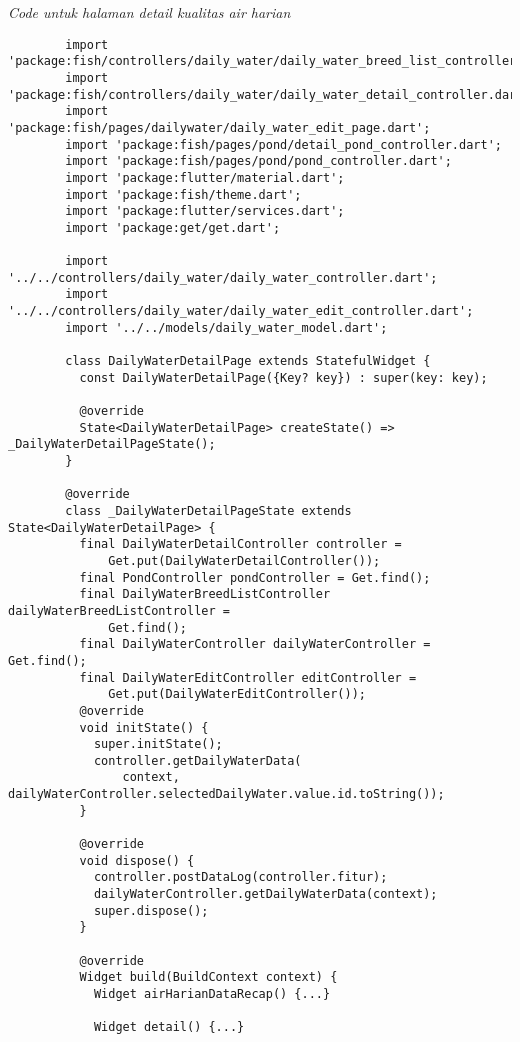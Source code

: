 	\textit{Code untuk halaman detail kualitas air harian}
	\begin{lstlisting}
        import 'package:fish/controllers/daily_water/daily_water_breed_list_controller.dart';
        import 'package:fish/controllers/daily_water/daily_water_detail_controller.dart';
        import 'package:fish/pages/dailywater/daily_water_edit_page.dart';
        import 'package:fish/pages/pond/detail_pond_controller.dart';
        import 'package:fish/pages/pond/pond_controller.dart';
        import 'package:flutter/material.dart';
        import 'package:fish/theme.dart';
        import 'package:flutter/services.dart';
        import 'package:get/get.dart';
        
        import '../../controllers/daily_water/daily_water_controller.dart';
        import '../../controllers/daily_water/daily_water_edit_controller.dart';
        import '../../models/daily_water_model.dart';
        
        class DailyWaterDetailPage extends StatefulWidget {
          const DailyWaterDetailPage({Key? key}) : super(key: key);
        
          @override
          State<DailyWaterDetailPage> createState() => _DailyWaterDetailPageState();
        }
        
        @override
        class _DailyWaterDetailPageState extends State<DailyWaterDetailPage> {
          final DailyWaterDetailController controller =
              Get.put(DailyWaterDetailController());
          final PondController pondController = Get.find();
          final DailyWaterBreedListController dailyWaterBreedListController =
              Get.find();
          final DailyWaterController dailyWaterController = Get.find();
          final DailyWaterEditController editController =
              Get.put(DailyWaterEditController());
          @override
          void initState() {
            super.initState();
            controller.getDailyWaterData(
                context, dailyWaterController.selectedDailyWater.value.id.toString());
          }
        
          @override
          void dispose() {
            controller.postDataLog(controller.fitur);
            dailyWaterController.getDailyWaterData(context);
            super.dispose();
          }
        
          @override
          Widget build(BuildContext context) {
            Widget airHarianDataRecap() {...}
        
            Widget detail() {...}
        

\end{lstlisting}
